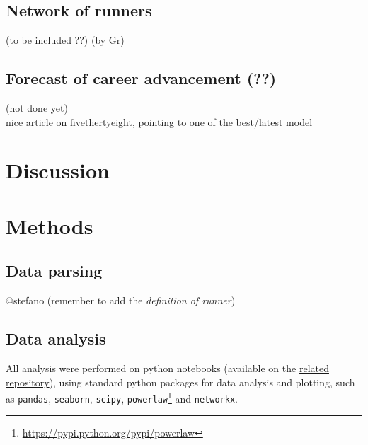 \documentclass[fleqn,10pt]{wlscirep}
\begin{document}
		\subsection*{Network of runners}
	
				(to be included ??)
				(by Gr)
		
		\subsection*{Forecast of career advancement (??)}
	
				(not done yet)		\\
				\href{https://fivethirtyeight.com/features/tell-us-two-things-and-well-tell-you-how-fast-youd-run-a-marathon/}{nice article on fivethertyeight},
				pointing to one of the best/latest model \cite{vickers2016empirical}

	

\section*{Discussion}


\section*{Methods}


	\subsection*{Data parsing}
	
		@stefano 
		(remember to add the \textit{definition of runner})
	
		
	
	
	\subsection*{Data analysis}
	
		All analysis were performed on python notebooks (available on the \href{related repository}{related repository}), using standard python packages for data analysis and plotting, such as \texttt{pandas}, \texttt{seaborn}, \texttt{scipy}, \texttt{powerlaw}\footnote{\url{https://pypi.python.org/pypi/powerlaw}} and \texttt{networkx}.
	
\end{document}
